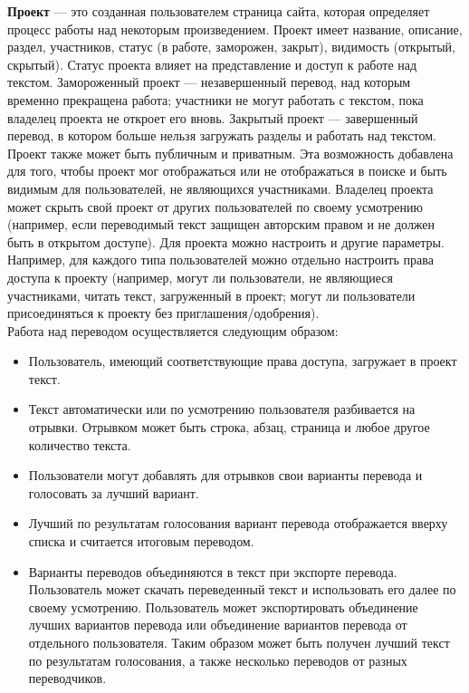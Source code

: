 \documentclass[a4paper,12pt]{article}
\begin{document}
\textbf{Проект} — это созданная пользователем страница сайта, которая определяет процесс работы над некоторым произведением. Проект имеет название, описание, раздел, участников, статус (в работе, заморожен, закрыт), видимость (открытый, скрытый). Статус проекта влияет на представление и доступ к работе над текстом. Замороженный проект — незавершенный перевод, над которым временно прекращена работа; участники не могут работать с текстом, пока владелец проекта не откроет его вновь. Закрытый проект — завершенный перевод, в котором больше нельзя загружать разделы и работать над текстом. Проект также может быть публичным и приватным. Эта возможность добавлена для того, чтобы проект мог отображаться или не отображаться в поиске и быть видимым для пользователей, не являющихся участниками. Владелец проекта может скрыть свой проект от других пользователей по своему усмотрению (например, если переводимый текст защищен авторским правом и не должен быть в открытом доступе). Для проекта можно настроить и другие параметры. Например, для каждого типа пользователей можно отдельно настроить права доступа к проекту (например, могут ли пользователи, не являющиеся участниками, читать текст, загруженный в проект; могут ли пользователи присоединяться к проекту без приглашения/одобрения).\\

Работа над переводом осуществляется следующим образом:

\begin{itemize}
\item Пользователь, имеющий соответствующие права доступа, загружает в проект текст.
\item Текст автоматически или по усмотрению пользователя разбивается на отрывки. Отрывком может быть строка, абзац, страница и любое другое количество текста.
\item Пользователи могут добавлять для отрывков свои варианты перевода и голосовать за лучший вариант.
\item Лучший по результатам голосования вариант перевода отображается вверху списка и считается итоговым переводом.
\item Варианты переводов объединяются в текст при экспорте перевода. Пользователь может скачать переведенный текст и использовать его далее по своему усмотрению. Пользователь может экспортировать объединение лучших вариантов перевода или объединение вариантов перевода от отдельного пользователя. Таким образом может быть получен лучший текст по результатам голосования, а также несколько переводов от разных переводчиков.
\end{itemize}
\end{document}
